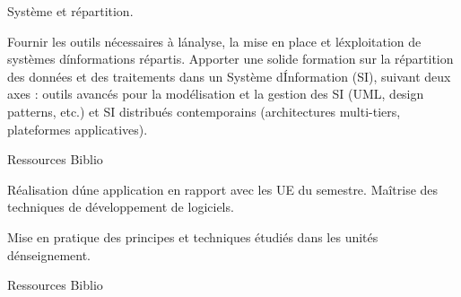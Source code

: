 {Système et répartition.} 
{\begin{itemize}
\ObjItem Fournir les outils nécessaires à l\'analyse, la mise en place et l\'exploitation de systèmes d\'informations répartis.
\ObjItem Apporter une solide formation sur la répartition des données et des traitements dans un Système d\'Information (SI), suivant deux axes :
outils avancés pour la modélisation et la gestion des SI (UML, design patterns, etc.) et SI distribués contemporains (architectures multi-tiers, plateformes applicatives).
\end{itemize} 
} 
{Ressources} 
{Biblio} 
 
\vfill

{
Réalisation d\'une application en rapport avec les UE du semestre. 
} 
{Maîtrise des techniques de développement de logiciels.} 
{\begin{itemize}
\ObjItem Mise en pratique des principes et techniques étudiés dans les unités d\'enseignement.
\end{itemize} 
} 
{Ressources} 
{Biblio} 

\vfill

